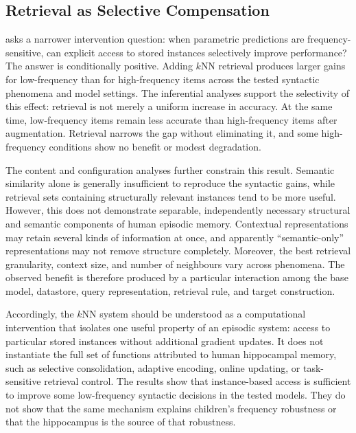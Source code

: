 \subsection{Retrieval as Selective Compensation}

 asks a narrower intervention question: when parametric predictions are frequency-sensitive, can explicit access to stored instances selectively improve performance? The answer is conditionally positive. Adding $k$NN retrieval produces larger gains for low-frequency than for high-frequency items across the tested syntactic phenomena and model settings. The inferential analyses support the selectivity of this effect: retrieval is not merely a uniform increase in accuracy. At the same time, low-frequency items remain less accurate than high-frequency items after augmentation. Retrieval narrows the gap without eliminating it, and some high-frequency conditions show no benefit or modest degradation.

The content and configuration analyses further constrain this result. Semantic similarity alone is generally insufficient to reproduce the syntactic gains, while retrieval sets containing structurally relevant instances tend to be more useful. However, this does not demonstrate separable, independently necessary structural and semantic components of human episodic memory. Contextual representations may retain several kinds of information at once, and apparently ``semantic-only'' representations may not remove structure completely. Moreover, the best retrieval granularity, context size, and number of neighbours vary across phenomena. The observed benefit is therefore produced by a particular interaction among the base model, datastore, query representation, retrieval rule, and target construction.

Accordingly, the $k$NN system should be understood as a computational intervention that isolates one useful property of an episodic system: access to particular stored instances without additional gradient updates. It does not instantiate the full set of functions attributed to human hippocampal memory, such as selective consolidation, adaptive encoding, online updating, or task-sensitive retrieval control. The results show that instance-based access is sufficient to improve some low-frequency syntactic decisions in the tested models. They do not show that the same mechanism explains children's frequency robustness or that the hippocampus is the source of that robustness.

